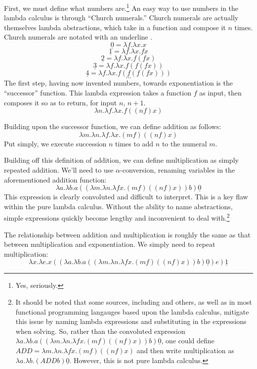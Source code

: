\documentclass[twocolumn,titlepage,12pt]{article}
\begin{document}
First, we must define what numbers are.\footnote{Yes, seriously.} An easy way to use numbers in the lambda calculus is through ``Church numerals.'' Church numerals are actually themselves lambda abstractions, which take in a function and compose it $n$ times. Church numerals are notated with an underline \cite{cornelllc}.
$$\underline{0}=\lambda f.\lambda x.x$$
$$\underline{1}=\lambda f.\lambda x.fx$$
$$\underline{2}=\lambda f.\lambda x.f(fx)$$
$$\underline{3}=\lambda f.\lambda x.f(f(fx))$$
$$\underline{4}=\lambda f.\lambda x.f(f(f(fx)))$$
$$...$$
The first step, having now invented numbers, towards exponentiation is the ``successor'' function. This lambda expression takes a function $f$ as input, then composes it so as to return, for input $n$, $n+1$.
$$\lambda n.\lambda f.\lambda x.f((n f) x)$$

Building upon the successor function, we can define addition as follows:
$$\lambda m.\lambda n.\lambda f.\lambda x.(m f) ((n f) x)$$
Put simply, we execute succession $n$ times to add $n$ to the numeral $m$.

Building off this definition of addition, we can define multiplication as simply repeated addition. We'll need to use $\alpha$-conversion, renaming variables in the aforementioned addition function:
$$\lambda a.\lambda b.a ((\lambda m.\lambda n.\lambda fx.(m f) ((n f) x)) b) \underline{0}$$
This expression is clearly convoluted and difficult to interpret. This is a key flaw within the pure lambda calculus. Without the ability to name abstractions, simple expressions quickly become lengthy and inconvenient to deal with.\footnote{It should be noted that some sources, including \cite{cornellc}\cite{rojastutorial} and others, as well as in most functional programming langauges based upon the lambda calculus, mitigate this issue by naming lambda expressions and substituting in the expressions when solving. So, rather than the convoluted expression $\lambda a.\lambda b.a ((\lambda m.\lambda n.\lambda fx.(m f) ((n f) x)) b) \underline{0}$, one could define $ADD=\lambda m.\lambda n.\lambda fx.(m f) ((n f) x)$ and then write multiplication as $\lambda a.\lambda b.(ADD b) \underline{0}$. However, this is not pure lambda calculus.}

The relationship between addition and multiplication is roughly the same as that between multiplication and exponentiation. We simply need to repeat multiplication:
$$\lambda x.\lambda e.x ((\lambda a.\lambda b.a ((\lambda m.\lambda n.\lambda fx.(m f) ((n f) x)) b) \underline{0}) e) \underline{1}$$
\end{document}
